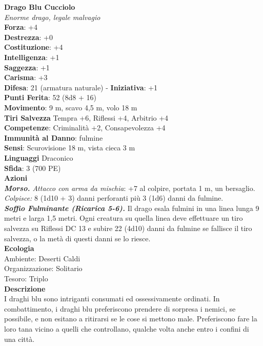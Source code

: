 \begin{multicols}{2}
\medskip\textbf{Drago Blu Cucciolo}\\
\emph{Enorme drago, legale malvagio}\\
\textbf{Forza}: +4\\
\textbf{Destrezza}: +0\\
\textbf{Costituzione}: +4\\
\textbf{Intelligenza}: +1\\
\textbf{Saggezza}: +1\\
\textbf{Carisma}: +3\\
\textbf{Difesa}: 21 (armatura naturale) - \textbf{Iniziativa}: +1\\
\textbf{Punti Ferita}: 52 (8d8 + 16)\\
\textbf{Movimento}: 9 m, scavo 4,5 m, volo 18 m\\
\textbf{Tiri Salvezza} Tempra +6, Riflessi +4, Arbitrio +4\\
\textbf{Competenze}: Criminalità +2, Consapevolezza +4\\
\textbf{Immunità al Danno}: fulmine\\
\textbf{Sensi}: Scurovisione 18 m, vista cieca 3 m\\
\textbf{Linguaggi} Draconico\\
\textbf{Sfida}: 3 (700 PE)\smallskip\\
\smallskip\textbf{Azioni}\\
\emph{\textbf{Morso.} Attacco con arma da mischia}: +7 al colpire, portata 1 m, un bersaglio.\\
\emph{Colpisce:} 8 (1d10 + 3) danni perforanti più 3 (1d6) danni da fulmine.\\
\emph{\textbf{Soffio Fulminante (Ricarica 5-6).}} Il drago esala fulmini in una linea lunga 9 metri e larga 1,5 metri. Ogni creatura su quella linea deve effettuare un tiro salvezza su Riflessi DC  13 e subire 22 (4d10) danni da fulmine se fallisce il tiro salvezza, o la metà di questi danni se lo riesce.\\
\textbf{Ecologia}\\
Ambiente: Deserti Caldi\\
Organizzazione: Solitario\\
Tesoro: Triplo\\
\textbf{Descrizione}\\
I draghi blu sono intriganti consumati ed ossessivamente ordinati. In combattimento, i draghi blu preferiscono prendere di sorpresa i nemici, se possibile, e non esitano a ritirarsi se le cose si mettono male. Preferiscono fare la loro tana vicino a quelli che controllano, qualche volta anche entro i confini di una città.\\



\end{multicols}
